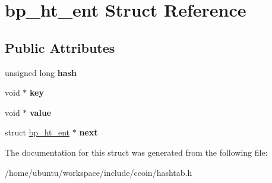 \hypertarget{structbp__ht__ent}{\section{bp\-\_\-ht\-\_\-ent Struct Reference}
\label{structbp__ht__ent}
}
\subsection*{Public Attributes}
\begin{DoxyCompactItemize}
\item 
\hypertarget{structbp__ht__ent_a0aefef3d181b9fcbac32d3db012ea231}{unsigned long {\bfseries hash}}\label{structbp__ht__ent_a0aefef3d181b9fcbac32d3db012ea231}

\item 
\hypertarget{structbp__ht__ent_a32aa376fc2361e73d75514f88471bddf}{void $\ast$ {\bfseries key}}\label{structbp__ht__ent_a32aa376fc2361e73d75514f88471bddf}

\item 
\hypertarget{structbp__ht__ent_ac762a0d6a4deb7adaae9c7dc0937bcac}{void $\ast$ {\bfseries value}}\label{structbp__ht__ent_ac762a0d6a4deb7adaae9c7dc0937bcac}

\item 
\hypertarget{structbp__ht__ent_a4d4b401fb6d994f25728f976fd035088}{struct \hyperlink{structbp__ht__ent}{bp\-\_\-ht\-\_\-ent} $\ast$ {\bfseries next}}\label{structbp__ht__ent_a4d4b401fb6d994f25728f976fd035088}

\end{DoxyCompactItemize}


The documentation for this struct was generated from the following file\-:\begin{DoxyCompactItemize}
\item 
/home/ubuntu/workspace/include/ccoin/hashtab.\-h\end{DoxyCompactItemize}
